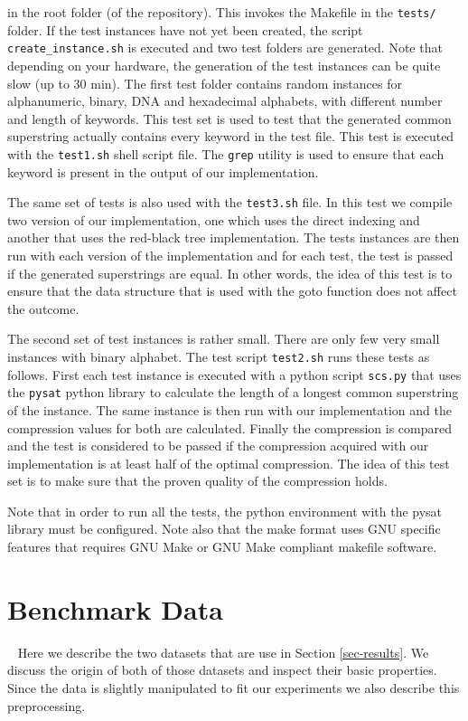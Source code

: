 \documentclass[english,twoside,censored,csm,algorithms-track-2020]{HYthesisML}
\theoremstyle{plain}
\theoremstyle{definition}
\begin{document}
in the root folder (of the repository). This invokes the Makefile in the \texttt{tests/} folder. If the
test instances have not yet been created, the script \texttt{create\_instance.sh} is executed and two
test folders are generated. Note that depending on your hardware, the generation of the test instances
can be quite slow (up to 30 min).
The first test folder contains random instances for alphanumeric, binary,
DNA and hexadecimal alphabets, with different number and length of keywords. This test set is used
to test that the generated common superstring actually contains every keyword in the test file. This
test is executed with the \texttt{test1.sh} shell script file. The \texttt{grep} utility is used to ensure
that each keyword is present in the output of our implementation. 

The same set of tests is also used with the \texttt{test3.sh} file. In this test we compile two version
of our implementation, one which uses the direct indexing and another that uses the red-black tree
implementation. The tests instances are then run with each version of the implementation and for each
test, the test is passed if the generated superstrings are equal. In other words, the idea of this
test is to ensure that the data structure that is used with the goto function does not affect
the outcome.

The second set of test instances is rather small. There are only few very small instances with binary
alphabet. The test script \texttt{test2.sh} runs these tests as follows. First each test instance is
executed with a python script \texttt{scs.py} that uses the \texttt{pysat} python library to calculate
the length of a longest common superstring of the instance. The same instance is then run with our
implementation and the compression values for both are calculated. Finally the compression is compared
and the test is considered to be passed if the compression acquired with our implementation is
at least half of the optimal compression. The idea of this test set is to make sure that the proven
quality of the compression holds.

Note that in order to run all the tests, the python environment with the pysat library must be configured.
Note also that the make format uses GNU specific features that requires GNU Make or GNU Make compliant
makefile software. 



\section{Benchmark Data}~\label{data}
Here we describe the two datasets that are use in Section \ref{sec-results}. We discuss the origin
of both of those datasets and inspect their basic properties. Since the data is slightly manipulated
to fit our experiments we also describe this preprocessing.
\end{document}
